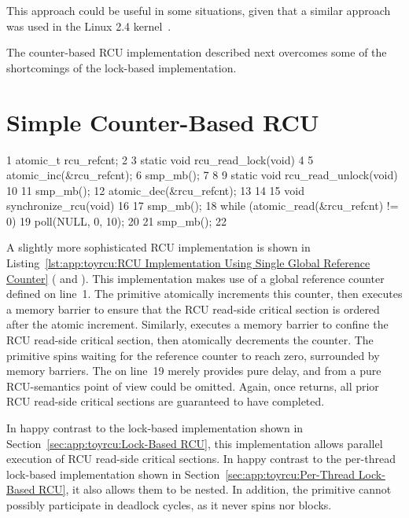 This approach could be useful in some situations, given that a similar
approach was used in the
Linux 2.4 kernel~\cite{Molnar00a}.

The counter-based RCU implementation described next overcomes some of
the shortcomings of the lock-based implementation.

\section{Simple Counter-Based RCU}
\label{sec:app:toyrcu:Simple Counter-Based RCU}

\begin{listing}[tbp]
{ \scriptsize
\begin{verbbox}
  1 atomic_t rcu_refcnt;
  2
  3 static void rcu_read_lock(void)
  4 {
  5   atomic_inc(&rcu_refcnt);
  6   smp_mb();
  7 }
  8
  9 static void rcu_read_unlock(void)
 10 {
 11   smp_mb();
 12   atomic_dec(&rcu_refcnt);
 13 }
 14
 15 void synchronize_rcu(void)
 16 {
 17   smp_mb();
 18   while (atomic_read(&rcu_refcnt) != 0) {
 19     poll(NULL, 0, 10);
 20   }
 21   smp_mb();
 22 }
\end{verbbox}
}
\centering
\theverbbox
\caption{RCU Implementation Using Single Global Reference Counter}
\label{lst:app:toyrcu:RCU Implementation Using Single Global Reference Counter}
\end{listing}

A slightly more sophisticated RCU implementation is shown in
Listing~\ref{lst:app:toyrcu:RCU Implementation Using Single Global Reference Counter}
( and ).
This implementation makes use of a global reference counter
 defined on line~1.
The  primitive atomically increments this
counter, then executes a memory barrier to ensure that the
RCU read-side critical section is ordered after the atomic
increment.
Similarly,  executes a memory barrier to
confine the RCU read-side critical section, then atomically
decrements the counter.
The  primitive spins waiting for the reference
counter to reach zero, surrounded by memory barriers.
The  on line~19 merely provides pure delay, and from
a pure RCU-semantics point of view could be omitted.
Again, once  returns, all prior
RCU read-side critical sections are guaranteed to have completed.

In happy contrast to the lock-based implementation shown in
Section~\ref{sec:app:toyrcu:Lock-Based RCU}, this implementation
allows parallel execution of RCU read-side critical sections.
In happy contrast to the per-thread lock-based implementation shown in
Section~\ref{sec:app:toyrcu:Per-Thread Lock-Based RCU},
it also allows them to be nested.
In addition, the  primitive cannot possibly
participate in deadlock cycles, as it never spins nor blocks.

